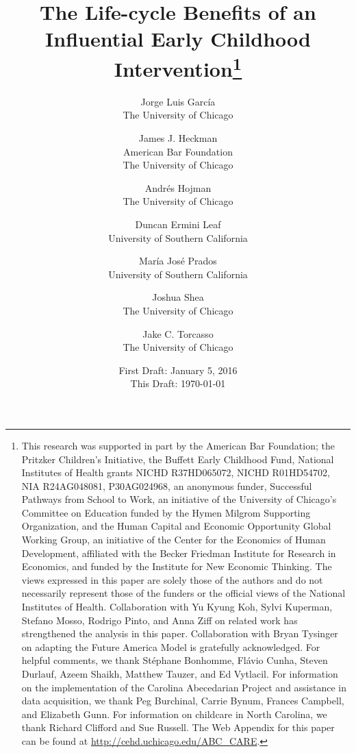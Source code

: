 






\begin{titlepage}

\title{\Large \textbf{The Life-cycle Benefits of an Influential Early Childhood Intervention}\thanks{This research was supported in part by the American Bar Foundation; the Pritzker Children's Initiative, the Buffett Early Childhood Fund, National Institutes of Health grants NICHD R37HD065072, NICHD R01HD54702, NIA R24AG048081, P30AG024968, an anonymous funder, Successful Pathways from School to Work, an initiative of the University of Chicago's Committee on Education funded by the Hymen Milgrom Supporting Organization, and the Human Capital and Economic Opportunity Global Working Group, an initiative of the Center for the Economics of Human Development, affiliated with the Becker Friedman Institute for Research in Economics, and funded by the Institute for New Economic Thinking. The views expressed in this paper are solely those of the authors and do not necessarily represent those of the funders or the official views of the National Institutes of Health. Collaboration with Yu Kyung Koh, Sylvi Kuperman, Stefano Mosso, Rodrigo Pinto, and Anna Ziff on related work has strengthened the analysis in this paper. Collaboration with Bryan Tysinger on adapting the Future America Model is gratefully acknowledged. For helpful comments, we thank St\'{e}phane Bonhomme, Fl\'{a}vio Cunha, Steven Durlauf, Azeem Shaikh, Matthew Tauzer, and Ed Vytlacil. For information on the implementation of the Carolina Abecedarian Project and assistance in data acquisition, we thank Peg Burchinal, Carrie Bynum, Frances Campbell, and Elizabeth Gunn. For information on childcare in North Carolina, we thank Richard Clifford and Sue Russell. The Web Appendix for this paper can be found at \url{http://cehd.uchicago.edu/ABC_CARE}.}}

\author{
Jorge Luis Garc\'{i}a\\
The University of Chicago \and
James J. Heckman \\
American Bar Foundation \\
The University of Chicago \and
Andr\'{e}s Hojman\\
The University of Chicago \and
Duncan Ermini Leaf \\
University of Southern California \and
Mar\'{i}a Jos\'{e} Prados \\
University of Southern California \and
Joshua Shea \\
The University of Chicago \and
Jake C. Torcasso\\
The University of Chicago}
\date{First Draft: January 5, 2016\\ This Draft: \today}

\maketitle

\end{titlepage}

